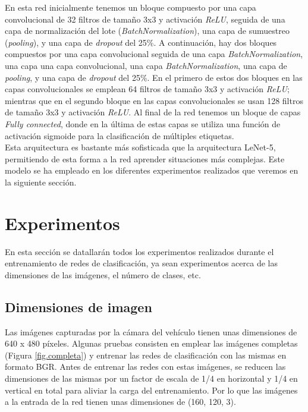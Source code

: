 En esta red inicialmente tenemos un bloque compuesto por una capa convolucional de 32 filtros de tamaño 3x3 y activación \textit{ReLU}, seguida de una capa de normalización del lote (\textit{BatchNormalization}), una capa de sumuestreo (\textit{pooling}), y una capa de \textit{dropout} del 25\%. A continuación, hay dos bloques compuestos por una capa convolucional seguida de una capa \textit{BatchNormalization}, una capa una capa convolucional, una capa \textit{BatchNormalization}, una capa de \textit{pooling}, y una capa de \textit{dropout} del 25\%. En el primero de estos dos bloques en las capas convolucionales se emplean 64 filtros de tamaño 3x3 y activación \textit{ReLU}; mientras que en el segundo bloque en las capas convolucionales se usan 128 filtros de tamaño 3x3 y activación \textit{ReLU}. Al final de la red tenemos un bloque de capas \textit{Fully connected}, donde en la última de estas capas se utiliza una función de activación sigmoide para la clasificación de múltiples etiquetas.\\


Esta arquitectura es bastante más sofisticada que la arquitectura LeNet-5, permitiendo de esta forma a la red aprender situaciones más complejas. Este modelo se ha empleado en los diferentes experimentos realizados que veremos en la siguiente sección.


\section{Experimentos}

En esta sección se datallarán todos los experimentos realizados durante el entrenamiento de redes de clasificación, ya sean experimentos acerca de las dimensiones de las imágenes, el número de clases, etc. \\


\subsection{Dimensiones de imagen}

Las imágenes capturadas por la cámara del vehículo tienen unas dimensiones de 640 x 480 píxeles. Algunas pruebas consisten en emplear las imágenes completas (Figura \ref{fig.completa}) y entrenar las redes de clasificación con las mismas en formato BGR. Antes de entrenar las redes con estas imágenes, se reducen las dimensiones de las mismas por un factor de escala de 1/4 en horizontal y 1/4 en vertical en total para aliviar la carga del entrenamiento. Por lo que las imágenes a la entrada de la red tienen unas dimensiones de (160, 120, 3).\\

